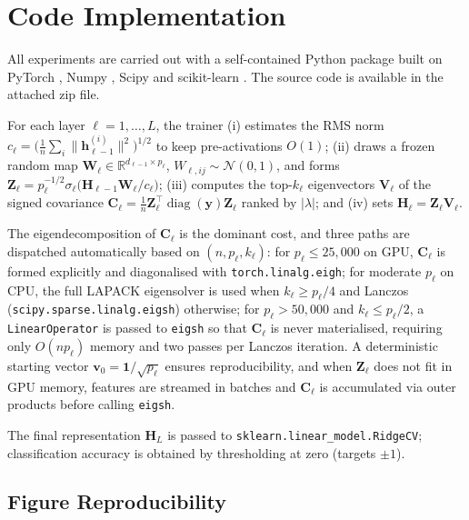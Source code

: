 \section{Code Implementation}

\label{2605:app:code-implem}

All experiments are carried out with a self-contained Python package built on PyTorch \cite{paszke2019pytorch}, Numpy \cite{harris2020array}, Scipy \cite{virtanen2020scipy} and scikit-learn \cite{pedregosa2011scikit}. The source code is available in the attached zip file.

For each layer $\ell = 1, \ldots, L$, the trainer
(i) estimates the RMS norm
$c_\ell = \bigl(\tfrac{1}{n}\sum_i \|\mathbf{h}_{\ell-1}^{(i)}\|^2\bigr)^{1/2}$
to keep pre-activations $O(1)$;
(ii) draws a frozen random map
$\mathbf{W}_\ell \in \mathbb{R}^{d_{\ell-1}\times p_\ell}$,
$W_{\ell,ij}\sim\mathcal{N}(0,1)$,
and forms
$\mathbf{Z}_\ell = p_\ell^{-1/2} 
\sigma_\ell \bigl(\mathbf{H}_{\ell-1}\mathbf{W}_\ell / c_\ell\bigr)$;
(iii) computes the top-$k_\ell$ eigenvectors $\mathbf{V}_\ell$ of the signed
covariance
$\mathbf{C}_\ell = \tfrac{1}{n}\mathbf{Z}_\ell^\top
\operatorname{diag}(\mathbf{y}) \mathbf{Z}_\ell$
ranked by $|\lambda|$; and
(iv) sets $\mathbf{H}_\ell = \mathbf{Z}_\ell\mathbf{V}_\ell$.

The eigendecomposition of $\mathbf{C}_\ell$ is the dominant cost, and three
paths are dispatched automatically based on $(n,p_\ell,k_\ell)$: for
$p_\ell\le 25{,}000$ on GPU, $\mathbf{C}_\ell$ is formed explicitly and
diagonalised with \texttt{torch.linalg.eigh}; for moderate $p_\ell$ on CPU,
the full LAPACK eigensolver is used when $k_\ell\ge p_\ell/4$ and Lanczos \\
(\texttt{scipy.sparse.linalg.eigsh}) otherwise; for $p_\ell > 50{,}000$ and
$k_\ell\le p_\ell/2$, a \texttt{LinearOperator} is passed to \texttt{eigsh}
so that $\mathbf{C}_\ell$ is never materialised, requiring only $O(np_\ell)$
memory and two passes per Lanczos iteration. A deterministic starting vector
$\mathbf{v}_0=\mathbf{1}/ \sqrt{p_\ell}$ ensures reproducibility, and when
$\mathbf{Z}_\ell$ does not fit in GPU memory, features are streamed in batches
and $\mathbf{C}_\ell$ is accumulated via outer products before calling
\texttt{eigsh}.

The final representation $\mathbf{H}_L$ is passed to
\texttt{sklearn.linear\_model.RidgeCV}; classification accuracy is obtained by thresholding at zero (targets $\pm 1$). 

\subsection{Figure Reproducibility}\label{2605:app:hyper-params}

